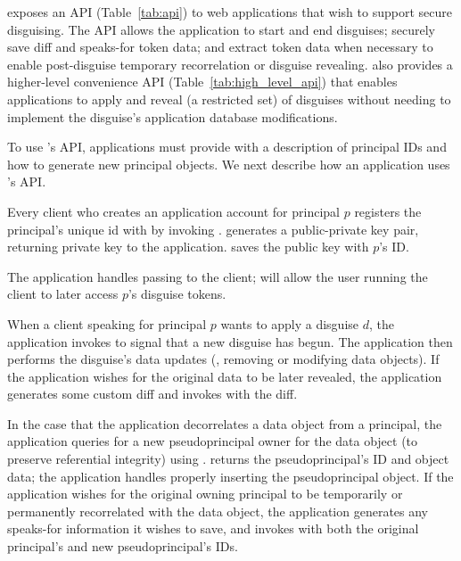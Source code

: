 \sys exposes an API (Table~\ref{tab:api}) to web applications that wish to support secure
disguising.
%
The API allows the application to start and end disguises; securely save diff and speaks-for token
data; and extract token data when necessary to enable post-disguise temporary recorrelation or
disguise revealing.
%
\sys also provides a higher-level convenience API (Table~\ref{tab:high_level_api}) that enables
applications to apply and reveal (a restricted set) of disguises without needing to implement the
disguise's application database modifications.

To use \sys's API, applications must provide \sys with a description of principal IDs and how to
generate new principal objects.
We next describe how an application uses \sys's API.

Every client who creates an application account for principal $p$ registers the principal's unique id
with \sys by invoking . \sys generates a public-private key pair, returning private key  to the
application. \sys saves the public key  with $p$'s ID.

The application handles passing  to the client;  will allow the user running the
client to later access $p$'s disguise tokens.

When a client speaking for principal $p$ wants to apply a disguise $d$,
the application invokes  to signal \sys that a new disguise has begun.
The application then performs the disguise's data updates (\eg, removing or modifying
data objects). If the application wishes for the original data to be later revealed, the
application generates some custom diff and invokes  with the diff.

In the case that the application decorrelates a data object from a principal, the application
queries \sys for a new pseudoprincipal owner for the data object (to preserve referential integrity)
using . \sys returns the pseudoprincipal's ID and object data; the
application handles properly inserting the pseudoprincipal object.  If the application wishes for
the original owning principal to be temporarily or permanently recorrelated with the data object,
the application generates any speaks-for information it wishes to save, and invokes
 with both the original principal's and new pseudoprincipal's IDs.

